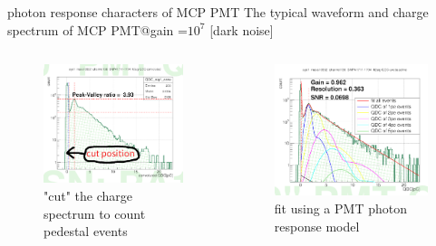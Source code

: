 \documentclass[11pt,compress,xcolor=x11names,UTF8]{beamer}
\begin{document}
\begin{frame}{photon response characters of MCP PMT }
The typical waveform and charge spectrum of MCP PMT@gain =$10^7$ [dark noise]
\begin{columns}
\begin{column}{.485\textwidth}
\begin{figure}
\centering
\includegraphics[width=\textwidth]{figure/specut.png} %
\caption{"cut" the charge spectrum to count pedestal events}
\end{figure}
\end{column}
\begin{column}{.5\textwidth}
\begin{figure}
\centering
\includegraphics[width=\textwidth]{figure/spefit.png} %
\caption{fit using a PMT photon response model}
\end{figure}
\end{column}
\end{columns}
\end{frame}
\end{document}
